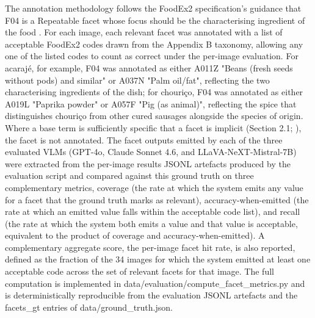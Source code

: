 The annotation methodology follows the FoodEx2 specification's guidance that F04 is a Repeatable facet whose focus should be the characterising ingredient of the food \parencite{european_food_safety_authority__efsa__200edd3d}. For each image, each relevant facet was annotated with a list of acceptable FoodEx2 codes drawn from the Appendix B taxonomy, allowing any one of the listed codes to count as correct under the per-image evaluation. For acarajé, for example, F04 was annotated as either A011Z "Beans (fresh seeds without pods) and similar" or A037N "Palm oil/fat", reflecting the two characterising ingredients of the dish; for chouriço, F04 was annotated as either A019L "Paprika powder" or A057F "Pig (as animal)", reflecting the spice that distinguishes chouriço from other cured sausages alongside the species of origin. Where a base term is sufficiently specific that a facet is implicit (Section 2.1; \cite[p.~26]{european_food_safety_authority__efsa__200edd3d}), the facet is not annotated. The facet outputs emitted by each of the three evaluated VLMs (GPT-4o, Claude Sonnet 4.6, and LLaVA-NeXT-Mistral-7B) were extracted from the per-image results JSONL artefacts produced by the evaluation script and compared against this ground truth on three complementary metrics, coverage (the rate at which the system emits any value for a facet that the ground truth marks as relevant), accuracy-when-emitted (the rate at which an emitted value falls within the acceptable code list), and recall (the rate at which the system both emits a value and that value is acceptable, equivalent to the product of coverage and accuracy-when-emitted). A complementary aggregate score, the per-image facet hit rate, is also reported, defined as the fraction of the 34 images for which the system emitted at least one acceptable code across the set of relevant facets for that image. The full computation is implemented in data/evaluation/compute\_facet\_metrics.py and is deterministically reproducible from the evaluation JSONL artefacts and the facets\_gt entries of data/ground\_truth.json.

